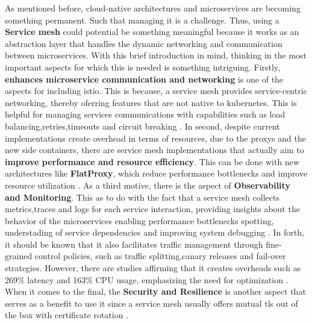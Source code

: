 As mentioned before, cloud-native architectures and microservices are becoming something permanent. Such that managing it is a challenge. Thus, using a \textbf{Service mesh} could potential be something meaningful because it works as an abstraction layer that handles the dynamic networking and communication between microservices. With this brief introduction in mind, thinking in the most important aspects for which this is needed is something intriguing. Firstly, \textbf{enhances microservice communication and networking} is one of the aspects for including istio. This is because, a service mesh provides service-centric networking, thereby oferring features that are not native to kubernetes. This is helpful for managing services communications with capabilities such as load balancing,retries,timeouts and circuit breaking \cite{service-mesh-enhance-communications}. In second, despite current implementations create overhead in terms of resources, due to the proxys and the new side containers, there are service mesh implementations that actually aim to \textbf{improve performance and resource efficiency}. This can be done with new architectures like \textbf{FlatProxy}, which reduce performance bottlenecks and improve resource utilization \cite{service-mesh-flat-proxy}. As a third motive, there is the aspect of \textbf{Observability and Monitoring}. This as to do with the fact that a service mesh collects metrics,traces and logs for each service interaction, providing insights about the behavior of the microservices enabling performance bottlenecks spotting, understading of service dependencies and improving system debugging \cite{service-mesh-monitoring}. In forth, it should be known that it also facilitates traffic management through fine-grained control policies, such as traffic splitting,canary releases and fail-over strategies. However, there are studies affirming that it creates overheads such as 269\% latency and 163\% CPU usage, emphasizing the need for optimization \cite{service-mesh-traffic}. When it comes to the final, the \textbf{Security and Resilience} is another aspect that serves as a benefit to use it since a service mesh usually offers mutual tls out of the box with certificate rotation \cite{service-mesh-security}. 

